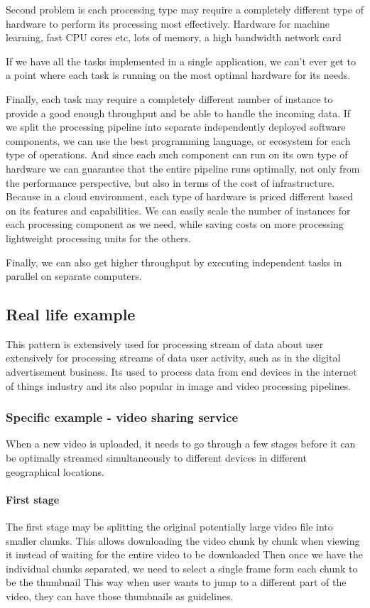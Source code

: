 Second problem is each processing type may require a completely different type of hardware to perform its processing most effectively.
Hardware for machine learning, fast CPU cores etc, lots of memory, a high bandwidth network card

If we have all the tasks implemented in a single application, we can't ever get to a point where each task is running on the most optimal hardware for its needs.

Finally, each task may require a completely different number of instance to provide a good enough throughput and be able to handle the incoming data.
If we split the processing pipeline into separate independently deployed software components, we can use the best programming language, or ecosystem for each type of operations.
And since each such component can run on its own type of hardware we can guarantee that the entire pipeline runs optimally, not only from the performance perspective, but also in terms of the cost of infrastructure.
Because in a cloud environment, each type of hardware is priced different based on its features and capabilities.
We can easily scale the number of instances for each processing component as we need, while saving costs on more processing lightweight processing units for the others.

Finally, we can also get higher throughput by executing independent tasks in parallel on separate computers.

\subsection{Real life example}
This pattern is extensively used for processing stream of data about user extensively for processing streams of data user activity, such as in the digital advertisement business.
Its used to process data from end devices in the internet of things industry and its also popular in image and video processing pipelines.

\subsubsection{Specific example - video sharing service}
When a new video is uploaded, it needs to go through a few stages before it can be optimally streamed simultaneously to different devices in different geographical locations.

\paragraph{First stage}
The first stage may be splitting the original potentially large video file into smaller chunks.
This allows downloading the video chunk by chunk when viewing it instead of waiting for the entire video to be downloaded
Then once we have the individual chunks separated, we need to select a single frame form each chunk to be the thumbnail
This way when user wants to jump to a different part of the video, they can have those thumbnails as guidelines.

